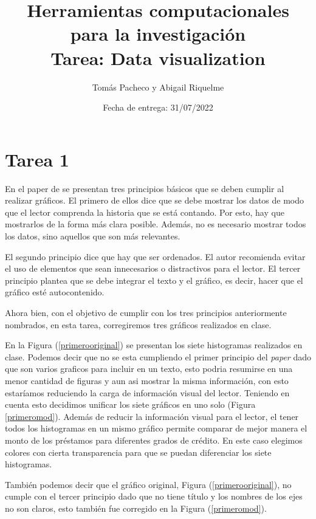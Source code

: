 \documentclass[12pt]{article}
\title{ %
Herramientas computacionales para la investigaci\'on \\
\vspace{0.3cm}
\textbf{Tarea: Data visualization}}
\author{Tom\'as Pacheco y Abigail Riquelme}
\date{Fecha de entrega: 31/07/2022}
\begin{document}
\maketitle
\onehalfspace


\section*{Tarea 1}


En el paper de \citet{schwabish2014economist} se presentan tres principios básicos que se deben cumplir al realizar gráficos. El primero de ellos dice que se debe mostrar los datos de modo que el lector comprenda la historia que se está contando. Por esto, hay que mostrarlos de la forma más clara posible. Además, no es necesario mostrar todos los datos, sino aquellos que son más relevantes. 

El segundo principio dice que hay que ser ordenados. El autor recomienda evitar el uso de elementos que sean innecesarios o distractivos para el lector. El tercer principio plantea que se debe integrar el texto y el gráfico, es decir, hacer que el gráfico esté autocontenido.

Ahora bien, con el objetivo de cumplir con los tres principios anteriormente nombrados, en esta tarea, corregiremos tres gráficos realizados en clase. 

En la Figura (\ref{primerooriginal}) se presentan los siete histogramas realizados en clase. Podemos decir que no se esta cumpliendo el primer principio del \textit{paper} dado que son varios graficos para incluir en un texto, esto podria resumirse en una menor cantidad de figuras y aun asi mostrar la misma informaci\'on, con esto estar\'iamos reduciendo la carga de informaci\'on visual del lector. Teniendo en cuenta esto decidimos unificar los siete gr\'aficos en uno solo (Figura \ref{primeromod}). Adem\'as de reducir la informaci\'on visual para el lector, el tener todos los histogramas en un mismo gr\'afico permite comparar de mejor manera el monto de los pr\'estamos para diferentes grados de cr\'edito. En este caso elegimos colores con cierta transparencia para que se puedan diferenciar los siete histogramas. 

También podemos decir que el gráfico original, Figura (\ref{primerooriginal}), no cumple con el tercer principio dado que no tiene título y los nombres de los ejes no son claros, esto también fue corregido en la Figura (\ref{primeromod}). 
\end{document}
